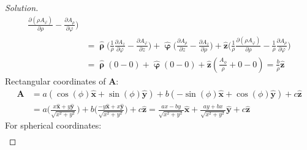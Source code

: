 \documentclass[crop=false,class=book,oneside]{standalone}
\begin{document}
\begin{proof}[Solution]
\begin{align*}
                        \frac{\partial(\rho{A_{\varphi}})}
                             {\partial\rho}
                        -\frac{\partial{A_{\rho}}}
                              {\partial\varphi}
                    \bigg)\\
                    &=\hat{\boldsymbol{\uprho}}\bigg(
                        \frac{1}{\rho}
                        \frac{\partial{A_{z}}}{\partial\varphi}
                        -\frac{\partial{A_{\varphi}}}
                              {\partial{z}}
                    \bigg)
                    +\hat{\boldsymbol{\upvarphi}}\bigg(
                        \frac{\partial{A_{\rho}}}{\partial{z}}
                        -\frac{\partial{A_{z}}}{\partial\rho}
                    \bigg)
                    +\hat{\mathbf{z}}\bigg(
                        \frac{1}{\rho}
                        \frac{\partial(\rho{A_{\varphi}})}
                             {\partial\rho}
                        -\frac{1}{\rho}
                        \frac{\partial{A_{\rho}}}
                             {\partial\varphi}
                    \bigg)\\
                    &=\hat{\boldsymbol{\uprho}}(0-0)
                     +\hat{\boldsymbol{\upvarphi}}(0-0)
                     +\hat{\mathbf{z}}(\frac{A_{\phi}}{\rho}+0-0)
                     =\frac{b}{\rho}\hat{\mathbf{z}}
                \end{align*}
                Rectangular coordinates of $\mathbf{A}$:
                \begin{align*}
                    \mathbf{A}
                    &=a(\cos(\phi)\hat{\mathbf{x}}
                    +\sin(\phi)\hat{\mathbf{y}})
                    +b(-\sin(\phi)\hat{\mathbf{x}}
                    +\cos(\phi)\hat{\mathbf{y}})
                    +c\hat{\mathbf{z}}\\
                    &=a\bigg(
                        \frac{x\hat{\mathbf{x}}
                        +y\hat{\mathbf{y}}}{\sqrt{x^{2}+y^{2}}}
                    \bigg)
                    +b\bigg(
                        \frac{-y\hat{\mathbf{x}}
                        +x\hat{\mathbf{y}}}{\sqrt{x^{2}+y^{2}}}
                    \bigg)
                    +c\hat{\mathbf{z}}
                    =\frac{ax-by}{\sqrt{x^{2}+y^{2}}}\hat{\mathbf{x}}
                    +\frac{ay+bx}{\sqrt{x^{2}+y^{2}}}\hat{\mathbf{y}}
                    +c\hat{\mathbf{z}}
                \end{align*}
                For spherical coordinates:
                \begin{align*}

\end{align*}
\end{proof}
\end{document}
